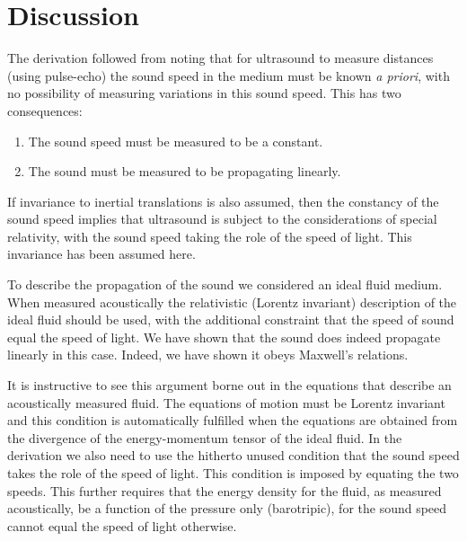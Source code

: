 \documentclass[10pt, fleqn,final,showtrims,oldfontcommands]{article} %
\begin{document}
\section{Discussion}\label{sec:discussion}




The derivation followed from noting that for ultrasound to measure distances (using pulse-echo) 
the sound speed in the medium must be known {\em a priori}, 
with no possibility of measuring variations in this sound speed.
This has two consequences:
\begin{enumerate}
  \item The sound speed must be measured to be a constant.
  \item The sound must be measured to be propagating linearly.
\end{enumerate}
If invariance to inertial translations is also assumed,
then the constancy of the sound speed  implies that 
ultrasound is subject to the considerations of special relativity,
with the sound speed taking the role of the speed of light.
This invariance has been assumed here.

To describe the propagation of the sound we considered an ideal fluid medium.
When measured acoustically the relativistic (Lorentz invariant) description of the ideal fluid should be used,
with the additional constraint that the speed of sound equal the speed of light.
We have shown that the sound does indeed propagate linearly in this case.
Indeed, we have shown it obeys Maxwell's relations.


It is instructive to see this argument borne out in the equations that describe an acoustically measured fluid.
The equations of motion must  be Lorentz invariant and this condition  is automatically fulfilled  when  the equations 
are obtained from the divergence of the energy-momentum tensor of the ideal fluid.
In the derivation we also need to use the hitherto unused  condition
that the sound speed takes the role  of the speed of light.
This condition is imposed by equating the two speeds.
This further requires that the energy density for the fluid, as measured acoustically, be a function of the pressure only (barotripic),
for the sound speed cannot equal the speed of light otherwise\cite{Taub1978}.


\end{document}
